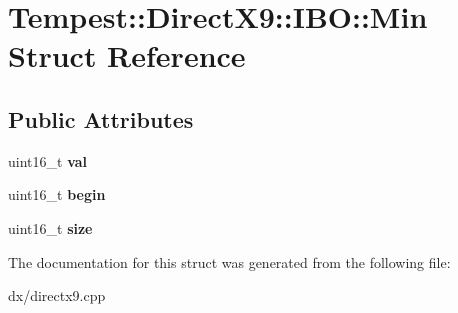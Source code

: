 \hypertarget{struct_direct_x9_1_1_i_b_o_1_1_min}{\section{Tempest\+:\+:Direct\+X9\+:\+:I\+B\+O\+:\+:Min Struct Reference}
\label{struct_direct_x9_1_1_i_b_o_1_1_min}
}
\subsection*{Public Attributes}
\begin{DoxyCompactItemize}
\item 
\hypertarget{struct_direct_x9_1_1_i_b_o_1_1_min_a452904e56fa12fbc652b459daa45ecb6}{uint16\+\_\+t {\bfseries val}}\label{struct_direct_x9_1_1_i_b_o_1_1_min_a452904e56fa12fbc652b459daa45ecb6}

\item 
\hypertarget{struct_direct_x9_1_1_i_b_o_1_1_min_a6bff736ca595b8fb6429fc80c5d3fa30}{uint16\+\_\+t {\bfseries begin}}\label{struct_direct_x9_1_1_i_b_o_1_1_min_a6bff736ca595b8fb6429fc80c5d3fa30}

\item 
\hypertarget{struct_direct_x9_1_1_i_b_o_1_1_min_aedee791c893c09300d394f32e7b286d8}{uint16\+\_\+t {\bfseries size}}\label{struct_direct_x9_1_1_i_b_o_1_1_min_aedee791c893c09300d394f32e7b286d8}

\end{DoxyCompactItemize}


The documentation for this struct was generated from the following file\+:\begin{DoxyCompactItemize}
\item 
dx/directx9.\+cpp\end{DoxyCompactItemize}
